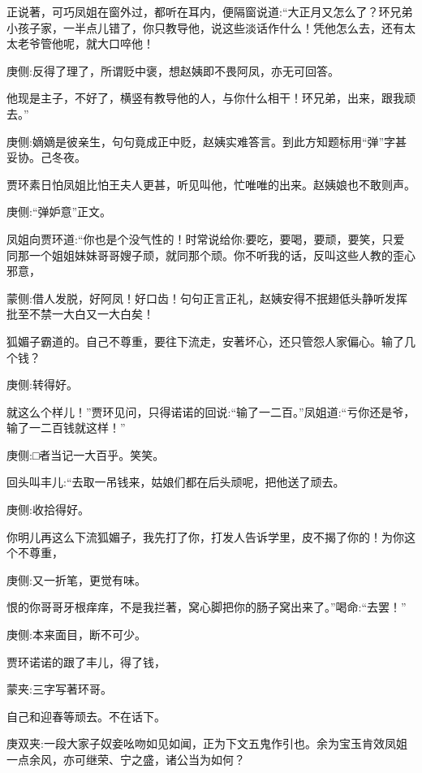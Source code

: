 \begin{parag}
    正说著，可巧凤姐在窗外过，都听在耳内，便隔窗说道:“大正月又怎么了？环兄弟小孩子家，一半点儿错了，你只教导他，说这些淡话作什么！凭他怎么去，还有太太老爷管他呢，就大口啐他！\begin{note}庚侧:反得了理了，所谓贬中褒，想赵姨即不畏阿凤，亦无可回答。\end{note}他现是主子，不好了，横竖有教导他的人，与你什么相干！环兄弟，出来，跟我顽去。”\begin{note}庚侧:嫡嫡是彼亲生，句句竟成正中贬，赵姨实难答言。到此方知题标用“弹”字甚妥协。己冬夜。\end{note}贾环素日怕凤姐比怕王夫人更甚，听见叫他，忙唯唯的出来。赵姨娘也不敢则声。\begin{note}庚侧:“弹妒意”正文。\end{note}凤姐向贾环道:“你也是个没气性的！时常说给你:要吃，要喝，要顽，要笑，只爱同那一个姐姐妹妹哥哥嫂子顽，就同那个顽。你不听我的话，反叫这些人教的歪心邪意，\begin{note}蒙侧:借人发脱，好阿凤！好口齿！句句正言正礼，赵姨安得不抿翅低头静听发挥批至不禁一大白又一大白矣！\end{note}狐媚子霸道的。自己不尊重，要往下流走，安著坏心，还只管怨人家偏心。输了几个钱？\begin{note}庚侧:转得好。\end{note}就这么个样儿！”贾环见问，只得诺诺的回说:“输了一二百。”凤姐道:“亏你还是爷，输了一二百钱就这样！”\begin{note}庚侧:□者当记一大百乎。笑笑。\end{note}回头叫丰儿:“去取一吊钱来，姑娘们都在后头顽呢，把他送了顽去。\begin{note}庚侧:收拾得好。\end{note}你明儿再这么下流狐媚子，我先打了你，打发人告诉学里，皮不揭了你的！为你这个不尊重，\begin{note}庚侧:又一折笔，更觉有味。\end{note}恨的你哥哥牙根痒痒，不是我拦著，窝心脚把你的肠子窝出来了。”喝命:“去罢！”\begin{note}庚侧:本来面目，断不可少。\end{note}贾环诺诺的跟了丰儿，得了钱，\begin{note}蒙夹:三字写著环哥。\end{note}自己和迎春等顽去。不在话下。\begin{note}庚双夹:一段大家子奴妾吆吻如见如闻，正为下文五鬼作引也。余为宝玉肯效凤姐一点余风，亦可继荣、宁之盛，诸公当为如何？\end{note}
\end{parag}


